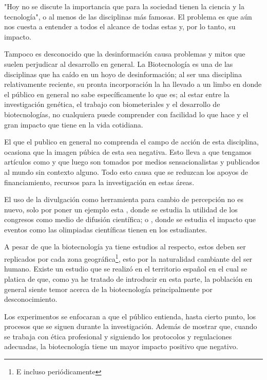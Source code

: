 \documentclass[12pt]{article}
\begin{document}
	\par "Hoy no se discute la importancia que para la sociedad tienen la ciencia y la tecnología"\cite{CC}, o al menos de las disciplinas más famosas. El problema es que a\'un nos cuesta a entender a todos el alcance de todas estas y, por lo tanto, su impacto.	
	\par Tampoco es desconocido que la desinformación causa problemas y mitos que suelen perjudicar al desarrollo en general. La Biotecnología es una de las disciplinas que ha caído en un hoyo de desinformación; al ser una disciplina relativamente reciente, su pronta incorporación la ha llevado a un limbo en donde el público en general no sabe específicamente lo que es; al estar entre la investigación genética, el trabajo con biometeriales y el desarrollo de biotecnologías, no cualquiera puede comprender con facilidad lo que hace y el gran impacto que tiene en la vida cotidiana.
	\par El que el publico en general no comprenda el campo de acción de esta disciplina, ocasiona que la imagen púbica de esta sea negativa. Esto lleva a que tengamos artículos como \cite{filos} y \cite{mTransgenicos} que luego son tomados por medios sensacionalistas y publicados al mundo sin contexto alguno. Todo esto causa que se reduzcan los apoyos de financiamiento, recursos para la investigación en estas áreas.
	\par El uso de la divulgación como herramienta para cambio de percepción no es nuevo, solo por poner un ejemplo esta \cite{utilidad congresos}, donde se estudia la utilidad de los congresos como medio de difusión científica; o \cite{olimpiadas}, donde se estudia el impacto que eventos como las olimpiadas científicas tienen en los estudiantes.
	\par A pesar de que la biotecnología ya tiene estudios al respecto, estos deben ser replicados por cada zona geográfica\footnote{E incluso periódicamente}, esto por la naturalidad cambiante del ser humano. Existe un estudio que se realizó en el territorio español \cite{bio en espania} en el cual se platica de que, como ya he tratado de introducir en esta parte, la población en general siente temor acerca de la biotecnología principalmente por desconocimiento.
	\par Los experimentos se enfocaran a que el público entienda, hasta cierto punto, los procesos que se siguen durante la investigación. Además de mostrar que, cuando se trabaja con ética profesional y siguiendo los protocolos y regulaciones adecuadas, la biotecnología tiene un mayor impacto positivo que negativo. 
\end{document}
